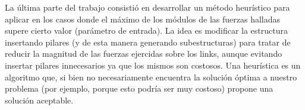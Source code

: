 	La última parte del trabajo consistió en desarrollar un método heurístico para aplicar en los casos donde el 
máximo de los módulos de las fuerzas halladas supere cierto valor (parámetro de entrada). La idea es
modificar la estructura insertando pilares (y de esta manera generando subestructuras)
para tratar de reducir la magnitud de las fuerzas ejercidas sobre los links, aunque evitando insertar pilares innecesarios
ya que los mismos son costosos. Una heurística es un algoritmo que, si bien no necesariamente encuentra la solución óptima
a nuestro problema (por ejemplo, porque esto podría ser muy costoso) propone una solución aceptable.
